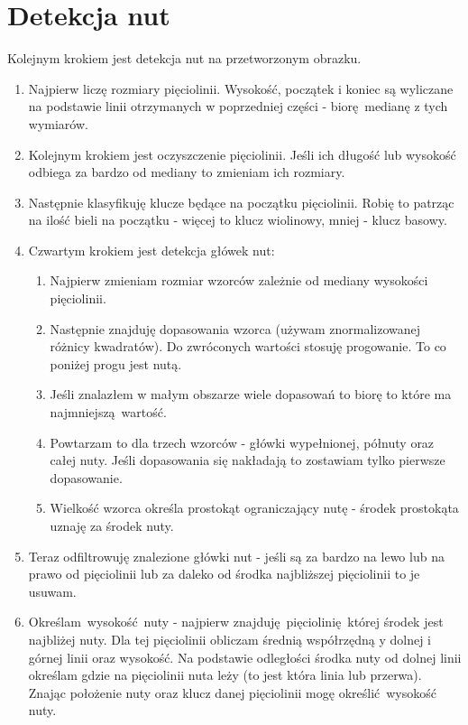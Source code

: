 \documentclass[12pt]{article}
\begin{document}
	\clearpage
	\section{Detekcja nut}
		Kolejnym krokiem jest detekcja nut na przetworzonym obrazku.
		\begin{enumerate}
			\item Najpierw liczę rozmiary pięciolinii. Wysokość, początek i koniec są wyliczane na podstawie linii otrzymanych w poprzedniej części - biorę medianę z tych wymiarów.
			\item Kolejnym krokiem jest oczyszczenie pięciolinii. Jeśli ich długość lub wysokość odbiega za bardzo od mediany to zmieniam ich rozmiary.
			\item Następnie klasyfikuję klucze będące na początku pięciolinii. Robię to patrząc na ilość bieli na początku - więcej to klucz wiolinowy, mniej - klucz basowy.
			\item Czwartym krokiem jest detekcja główek nut:
				\begin{enumerate}
					\item Najpierw zmieniam rozmiar wzorców zależnie od mediany wysokości pięciolinii.
					\item Następnie znajduję dopasowania wzorca (używam znormalizowanej różnicy kwadratów). Do zwróconych wartości stosuję progowanie. To co poniżej progu jest nutą.
					\item Jeśli znalazłem w małym obszarze wiele dopasowań to biorę to które ma najmniejszą wartość.
					\item Powtarzam to dla trzech wzorców - główki wypełnionej, półnuty oraz całej nuty. Jeśli dopasowania się nakładają to zostawiam tylko pierwsze dopasowanie.
					\item Wielkość wzorca określa prostokąt ograniczający nutę - środek prostokąta uznaję za środek nuty.
				\end{enumerate}
			\item Teraz odfiltrowuję znalezione główki nut - jeśli są za bardzo na lewo lub na prawo od pięciolinii lub za daleko od środka najbliższej pięciolinii to je usuwam.
			\item Określam wysokość nuty - najpierw znajduję pięciolinię której środek jest najbliżej nuty. Dla tej pięciolinii obliczam średnią współrzędną y dolnej i górnej linii oraz wysokość. Na podstawie odległości środka nuty od dolnej linii określam gdzie na pięciolinii nuta leży (to jest która linia lub przerwa). Znając położenie nuty oraz klucz danej pięciolinii mogę określić wysokość nuty.

\end{enumerate}
\end{document}

